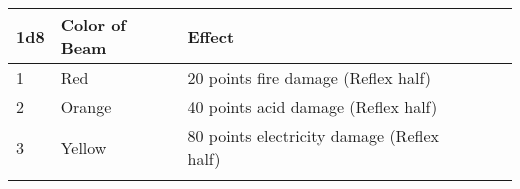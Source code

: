\begin{longtable}{llllll}
\hline
\multicolumn{1}{|p{0.289in}|}{\begin{minipage}[t]{0.289in}\raggedright
\textbf{1d8}\end{minipage}} & \multicolumn{1}{p{0.799in}|}{\begin{minipage}[t]{0.799in}\raggedright
\textbf{Color of Beam}\end{minipage}} & \multicolumn{1}{p{3.249in}|}{\begin{minipage}[t]{3.249in}\raggedright
\textbf{Effect}\end{minipage}}\\
\hline
\multicolumn{1}{p{0.055in}|}{\begin{minipage}[t]{0.055in}\raggedright
1\end{minipage}} & \multicolumn{1}{p{0.055in}|}{\begin{minipage}[t]{0.055in}\raggedright
Red\end{minipage}} & \multicolumn{1}{p{0.055in}|}{\begin{minipage}[t]{0.055in}\raggedright
20 points fire damage (Reflex half)\end{minipage}}\\
\hline
\multicolumn{1}{|p{0.289in}|}{\begin{minipage}[t]{0.289in}\raggedright
2\end{minipage}} & \multicolumn{1}{p{0.799in}|}{\begin{minipage}[t]{0.799in}\raggedright
Orange\end{minipage}} & \multicolumn{1}{p{3.249in}|}{\begin{minipage}[t]{3.249in}\raggedright
40 points acid damage (Reflex half)\end{minipage}}\\
\hline
\multicolumn{1}{p{0.055in}|}{\begin{minipage}[t]{0.055in}\raggedright
3\end{minipage}} & \multicolumn{1}{p{0.055in}|}{\begin{minipage}[t]{0.055in}\raggedright
Yellow\end{minipage}} & \multicolumn{1}{p{0.055in}|}{\begin{minipage}[t]{0.055in}\raggedright
80 points electricity damage (Reflex half)\end{minipage}}\\
\hline
\multicolumn{1}{|p{0.289in}|}{\begin{minipage}[t]{0.289in}\raggedright

\end{minipage}}
\end{longtable}
